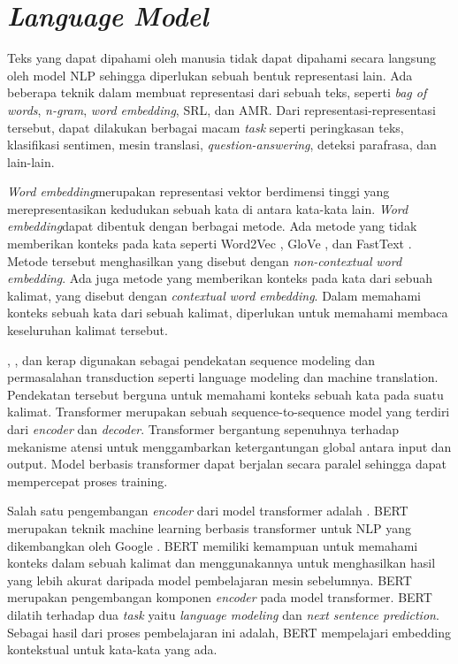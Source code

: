 \section{\textit{Language Model}}

\newcommand{\wordem}{\textit{word embedding}}
\newcommand{\Wordem}{\textit{Word embedding}}
\newcommand{\mwordem}{\textit{multilingual word embedding}}
\newcommand{\Mwordem}{\textit{Multilingual word embedding}}
\newcommand{\multil}{\textit{multilingual}}

Teks yang dapat dipahami oleh manusia tidak dapat dipahami secara langsung oleh model \gls{NLP} sehingga diperlukan sebuah bentuk representasi lain.
Ada beberapa teknik dalam membuat representasi dari sebuah teks, seperti \textit{bag of words}, \textit{n-gram}, \wordem{}, \gls{SRL}, dan \gls{AMR}.
Dari representasi-representasi tersebut, dapat dilakukan berbagai macam \textit{task} seperti peringkasan teks, klasifikasi sentimen, mesin translasi, \textit{question-answering}, deteksi parafrasa, dan lain-lain.

\Wordem merupakan representasi vektor berdimensi tinggi yang merepresentasikan kedudukan sebuah kata di antara kata-kata lain.
\Wordem dapat dibentuk dengan berbagai metode.
Ada metode yang tidak memberikan konteks pada kata seperti Word2Vec , GloVe , dan FastText .
Metode tersebut menghasilkan yang disebut dengan \textit{non-contextual} \wordem{}.
Ada juga metode yang memberikan konteks pada kata dari sebuah kalimat, yang disebut dengan \textit{contextual} \wordem{}.
Dalam memahami konteks sebuah kata dari sebuah kalimat, diperlukan untuk memahami membaca keseluruhan kalimat tersebut.

, , dan  kerap digunakan sebagai pendekatan sequence modeling dan permasalahan transduction seperti language modeling dan machine translation.
Pendekatan tersebut berguna untuk memahami konteks sebuah kata pada suatu kalimat.
Transformer merupakan sebuah sequence-to-sequence model yang terdiri dari \textit{encoder} dan \textit{decoder}.
Transformer bergantung sepenuhnya terhadap mekanisme atensi untuk menggambarkan ketergantungan global antara input dan output.
Model berbasis transformer dapat berjalan secara paralel sehingga dapat mempercepat proses training.

Salah satu pengembangan \textit{encoder} dari model transformer adalah .
\gls{BERT} merupakan teknik machine learning berbasis transformer untuk \gls{NLP} yang dikembangkan oleh Google .
\gls{BERT} memiliki kemampuan untuk memahami konteks dalam sebuah kalimat dan menggunakannya untuk menghasilkan hasil yang lebih akurat daripada model pembelajaran mesin sebelumnya.
\gls{BERT} merupakan pengembangan komponen \textit{encoder} pada model transformer.
\gls{BERT} dilatih terhadap dua \textit{task} yaitu \textit{language modeling} dan \textit{next sentence prediction}.
Sebagai hasil dari proses pembelajaran ini adalah, \gls{BERT} mempelajari embedding kontekstual untuk kata-kata yang ada.

